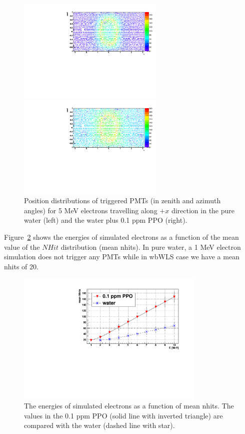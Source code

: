 \documentclass[preprint,12pt]{elsarticle}
\numberwithin{equation}{section}
\begin{document}
\begin{figure}[htbp]
	\centering
	\begin{minipage}[t]{0.48\textwidth}
		\centering
		\includegraphics[width=7cm]{PMT_5MeVElectronWater.pdf}
	\end{minipage}
	\begin{minipage}[t]{0.48\textwidth}
		\centering
		\includegraphics[width=7cm]{PMT_5MeVElectron0p1ppmPPO.pdf}
	\end{minipage}
	\caption{Position distributions of triggered PMTs (in zenith and azimuth angles) for 5 MeV electrons travelling along $+x$ direction in the pure water (left) and the water plus 0.1 ppm PPO (right).}
	\label{pmt_wls}
\end{figure}

Figure~\ref{nhit_wls} shows the energies of simulated electrons as a function of the mean value of the $NHit$ distribution (mean nhits). In pure water, a 1 MeV electron simulation does not trigger any PMTs while in wbWLS case we have a mean nhits of 20.

\begin{figure}[htbp]
	\centering	
	\includegraphics[width=9cm]{nhits_wls.pdf}
	\caption{ The energies of simulated electrons as a function of mean nhits. The values in the 0.1 ppm PPO (solid line with inverted triangle) are compared with the water (dashed line with star).}
	\label{nhit_wls}
\end{figure}
\end{document}
